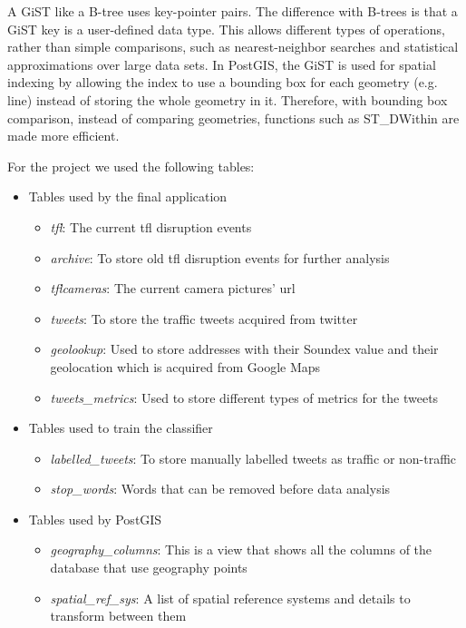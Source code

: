 A GiST like a B-tree uses key-pointer pairs. The difference with B-trees is that a GiST key is a user-defined data type. This allows different types of operations, rather than simple comparisons, such as nearest-neighbor searches and statistical approximations over large data sets. In PostGIS, the GiST is used for spatial indexing by allowing the index to use a bounding box for each geometry (e.g. line) instead of storing the whole geometry in it. Therefore, with bounding box comparison, instead of comparing geometries, functions such as ST\_DWithin are made more efficient. \cite{website:postgis_stdwithin}

For the project we used the following tables:
\begin{itemize}
\item Tables used by the final application
  \begin{itemize}
  \item \emph{tfl}: The current tfl disruption events
  \item \emph{archive}: To store old tfl disruption events for further analysis
  \item \emph{tflcameras}: The current camera pictures' url
  \item \emph{tweets}: To store the traffic tweets acquired from twitter
  \item \emph{geolookup}: Used to store addresses with their Soundex value and their geolocation which is acquired from Google Maps
  \item \emph{tweets\_metrics}: Used to store different types of metrics for the tweets
  \end{itemize}
\item Tables used to train the classifier
  \begin{itemize}
  \item \emph{labelled\_tweets}: To store manually labelled tweets as traffic or non-traffic
  \item \emph{stop\_words}: Words that can be removed before data analysis
  \end{itemize}
\item Tables used by PostGIS
  \begin{itemize}
  \item \emph{geography\_columns}: This is a view that shows all the columns of the database that use geography points
  \item \emph{spatial\_ref\_sys}: A list of spatial reference systems and details to transform between them
  \end{itemize}
\end{itemize}

